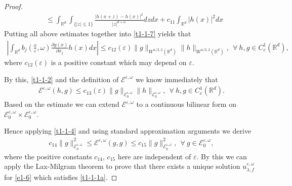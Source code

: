 \documentclass[11pt,draft, reqno]{amsart}
\renewcommand{\le}{\leqslant}
\def\EE{{\mathcal E}}
\newcommand{\R}{\mathds R}
\newcommand{\e}{\varepsilon}
\newcommand{\w}{\omega}
\theoremstyle{definition}
\numberwithin{equation}{section}
\begin{document}
\begin{proof}
\begin{align*}
&\le \int_{\R^d}\int_{\{|z|\le 1\}}\frac{\left|h(x+z)-h(x)\right|^2}{|z|^{d+\alpha}}dzdx+c_{11}\int_{\R^d}|h(x)|^2dx
\end{align*}
Putting all above estimates together into \eqref{t1-1-7} yields that
\begin{align*}
\left|\int_{\R^d} b_j\left(\frac{x}{\e},\w\right)\frac{\partial g(x)}{\partial x_j} h(x)dx\right|\le
c_{12}(\e)\|g\|_{W^{\alpha/2,2}(\R^d)}\|h\|_{W^{\alpha/2,2}(\R^d)},\ \ \forall\ h,g\in C_c^1(\R^d),
\end{align*}
where $c_{12}(\e)$ is a positive constant which may depend on $\e$.

By this, \eqref{t1-1-2} and the definition of $\EE^{\e,\w}$ we know immediately that
\begin{align*}
\EE^{\e,\w}(h,g)\le c_{13}(\e)\|g\|_{\EE^{\e,\w}_0}\|h\|_{\EE^{\e,\w}_0},\ \ \forall\ h,g\in C_c^1(\R^d).
\end{align*}
Based on the estimate we can extend $\EE^{\e,\w}$ to a continuous bilinear form on $\EE^{\e,\w}_0\times \EE^{\e,\w}_0$.

Hence applying \eqref{t1-1-4} and using standard approximation arguments we derive
\begin{align*}
c_{14}\|g\|_{\EE^{\e,\w}_0}^2\le \EE^{\e,\w}(g,g) \le c_{15}\|g\|_{\EE^{\e,\w}_0}^2,\ \ \forall\ g\in \EE^{\e,\w}_0,
\end{align*}
where the positive constants $c_{14}$, $c_{15}$ here are independent of $\e$.
By this we can apply the Lax-Milgram theorem to prove that there exists a unique solution $u_{\lambda,f}^{\e,\w}$ for
\eqref{e1-6} which satisfies \eqref{t1-1-1a}.
\end{proof}
\end{document}
